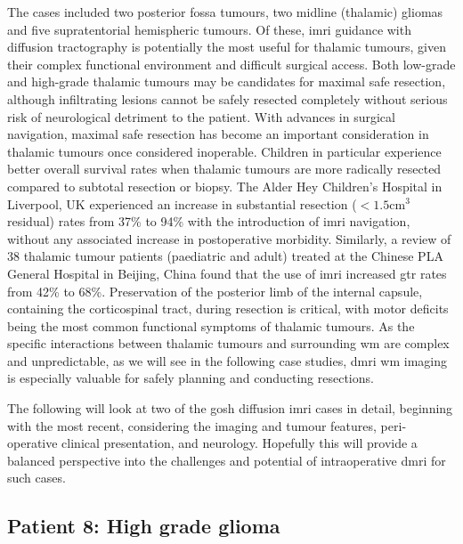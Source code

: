 The cases included two posterior fossa tumours, two midline (thalamic) gliomas and five supratentorial hemispheric tumours.
Of these, \gls{imri} guidance with diffusion tractography is potentially the most useful for thalamic tumours, given their complex functional environment and difficult surgical access.
Both low-grade \autocite{Wong2016} and high-grade\autocite{Dorfer2021} thalamic tumours may be candidates for maximal safe resection, although infiltrating lesions cannot be safely resected completely without serious risk of neurological detriment to the patient.
With advances in surgical navigation, maximal safe resection has become an important consideration in thalamic tumours once considered inoperable\autocite{Souweidane1996,Puget2007,Steinbok2016,Grewal2019,Sunderland2021}.
Children in particular\autocite{Ferroli2023} experience better overall survival rates when thalamic tumours are more radically resected compared to subtotal resection or biopsy\autocite{Cinalli2018}.
The Alder Hey Children's Hospital in Liverpool, UK experienced an increase in substantial resection ($<1.5$cm$^3$ residual) rates from 37\% to 94\% with the introduction of \gls{imri} navigation, without any associated increase in postoperative morbidity\autocite{Sunderland2021}.
Similarly, a review of 38 thalamic tumour patients (paediatric and adult) treated at the Chinese PLA General Hospital in Beijing, China found that the use of \gls{imri} increased \gls{gtr} rates from 42\% to 68\%\autocite{Zheng2016}.
Preservation of the posterior limb of the internal capsule, containing the corticospinal tract, during resection is critical, with motor deficits being the most common functional symptoms of thalamic tumours\autocite{Puget2007, Zheng2016, Palmisciano2021}.
As the specific interactions between thalamic tumours and surrounding \gls{wm} are complex and unpredictable, as we will see in the following case studies, \gls{dmri} \gls{wm} imaging is especially valuable for safely planning and conducting resections\autocite{Celtikci2017}.

The following will look at two of the \gls{gosh} diffusion \gls{imri} cases in detail, beginning with the most recent, considering the imaging and tumour features, peri-operative clinical presentation, and neurology.
Hopefully this will provide a balanced perspective into the challenges and potential of intraoperative \gls{dmri} for such cases.

\subsection{Patient 8: High grade glioma}

